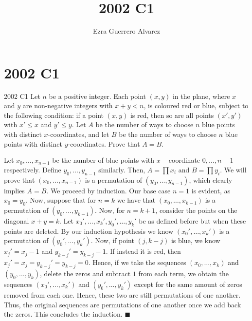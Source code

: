 \documentclass[14pt]{article}
\title{2002 C1}
\author{Ezra Guerrero Alvarez}
\begin{document}
\maketitle
	
\section*{2002 C1}

\begin{statement}{2002 C1}
	Let $n$ be a positive integer. Each point $(x,y)$ in the plane, where $x$ and $y$ are non-negative integers with $x+y<n$, is coloured red or blue, subject to the following condition: if a point $(x,y)$ is red, then so are all points $(x',y')$ with $x'\leq x$ and $y'\leq y$. Let $A$ be the number of ways to choose $n$ blue points with distinct $x$-coordinates, and let $B$ be the number of ways to choose $n$ blue points with distinct $y$-coordinates. Prove that $A=B$.
\end{statement}
Let $x_0,\ldots,x_{n-1}$ be the number of blue points with $x-$coordinate $0,\ldots,n-1$ respectively. Define $y_0,\ldots,y_{n-1}$ similarly. Then, $A=\prod x_i$ and $B=\prod y_i$. We will prove that $(x_0,\ldots,x_{n-1})$ is a permutation of $(y_0,\ldots,y_{n-1})$, which clearly implies $A=B$. We proceed by induction. Our base case $n=1$ is evident, as $x_0=y_0$. Now, suppose that for $n=k$ we have that $(x_0,\ldots,x_{k-1})$ is a permutation of $(y_0,\ldots,y_{k-1})$. Now, for $n=k+1$, consider the points on the diagonal $x+y=k$. Let $x_0',\ldots,x_k',y_0',\ldots,y_k'$ be as defined before but when these points are deleted. By our induction hypothesis we know $(x_0',\ldots,x_k')$ is a permutation of $(y_0',\ldots,y_k')$. Now, if point $(j,k-j)$ is blue, we know $x_j'=x_j-1$ and $y_{k-j}'=y_{k-j}-1$. If instead it is red, then $x_j'=x_j=y_{k-j}'=y_{k-j}=0$. Hence, if we take the sequences $(x_0,\ldots,x_k)$ and $(y_0,\ldots,y_k)$, delete the zeros and subtract $1$ from each term, we obtain the sequences $(x_0',\ldots,x_k')$ and $(y_0',\ldots,y_k')$ except for the same amount of zeros removed from each one. Hence, these two are still permutations of one another. Thus, the original sequences are permutations of one another once we add back the zeros. This concludes the induction. $\blacksquare$
	
\end{document}
